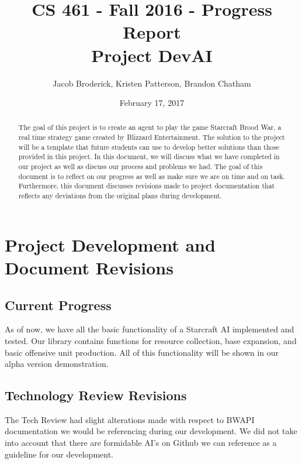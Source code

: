\documentclass[10pt,letterpaper,onecolumn,draftclsnofoot]{IEEEtran}
\begin{document}
	
	\begin{titlepage}
		
		\title{CS 461 - Fall 2016 - Progress Report \\ Project DevAI}
		\author{Jacob Broderick, Kristen Patterson, Brandon Chatham}
		\date{February 17, 2017}
		\maketitle
		\vspace{4cm}
		\begin{abstract}
			\noindent 
			\noindent
			The goal of this project is to create an agent to play the game Starcraft Brood War, a real time strategy game created by Blizzard Entertainment. The solution to the project will be a template that future students can use to develop better solutions than those provided in this project. In this document, we will discuss what we have completed in our project as well as discuss our process and problems we had. The goal of this document is to reflect on our progress as well as make sure we are on time and on task. Furthermore, this document discusses revisions made to project documentation that reflects any deviations from the original plans during development.
		\end{abstract}
	\end{titlepage}
	
	\section{Project Development and Document Revisions}
	
	\subsection{Current Progress}
	As of now, we have all the basic functionality of a Starcraft AI implemented and tested. Our library contains functions for resource collection, base expansion, and basic offensive unit production. All of this functionality will be shown in our alpha version demonstration. 
	
	\subsection{Technology Review Revisions}
	The Tech Review had slight alterations made with respect to BWAPI documentation we would be referencing during our development. We did not take into account that there are formidable AI's on Github we can reference as a guideline for our development. 
	
\end{document}
